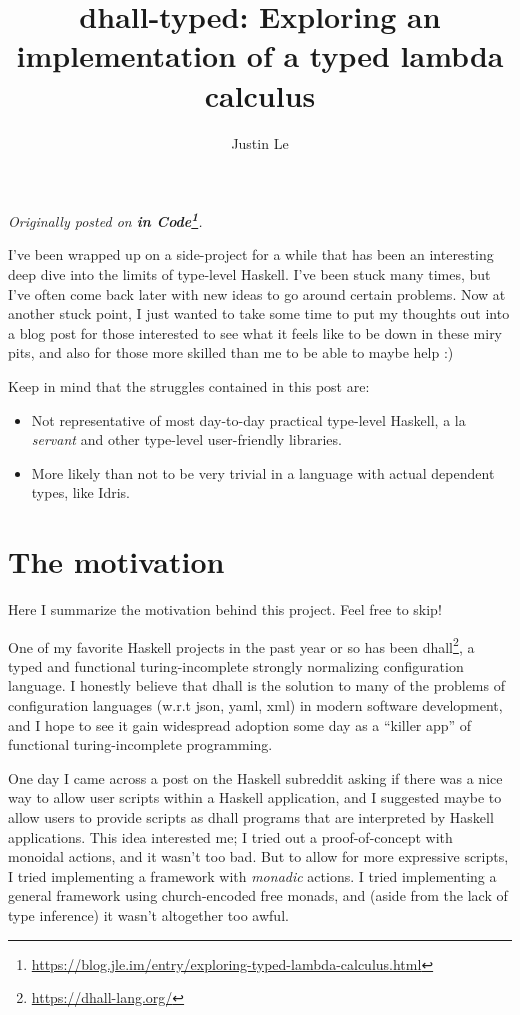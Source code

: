 \documentclass[]{article}
\title{dhall-typed: Exploring an implementation of a typed lambda calculus}
\author{Justin Le}
\renewcommand{\href}[2]{#2\footnote{\url{#1}}}
\begin{document}
\maketitle

\emph{Originally posted on
\textbf{\href{https://blog.jle.im/entry/exploring-typed-lambda-calculus.html}{in
Code}}.}

I've been wrapped up on a side-project for a while that has been an interesting
deep dive into the limits of type-level Haskell. I've been stuck many times, but
I've often come back later with new ideas to go around certain problems. Now at
another stuck point, I just wanted to take some time to put my thoughts out into
a blog post for those interested to see what it feels like to be down in these
miry pits, and also for those more skilled than me to be able to maybe help :)

Keep in mind that the struggles contained in this post are:

\begin{itemize}
\tightlist
\item
  Not representative of most day-to-day practical type-level Haskell, a la
  \emph{servant} and other type-level user-friendly libraries.
\item
  More likely than not to be very trivial in a language with actual dependent
  types, like Idris.
\end{itemize}

\hypertarget{the-motivation}{%
\section{The motivation}\label{the-motivation}}

Here I summarize the motivation behind this project. Feel free to skip!

One of my favorite Haskell projects in the past year or so has been
\href{https://dhall-lang.org/}{dhall}, a typed and functional turing-incomplete
strongly normalizing configuration language. I honestly believe that dhall is
the solution to many of the problems of configuration languages (w.r.t json,
yaml, xml) in modern software development, and I hope to see it gain widespread
adoption some day as a ``killer app'' of functional turing-incomplete
programming.

One day I came across a post on the Haskell subreddit asking if there was a nice
way to allow user scripts within a Haskell application, and I suggested maybe to
allow users to provide scripts as dhall programs that are interpreted by Haskell
applications. This idea interested me; I tried out a proof-of-concept with
monoidal actions, and it wasn't too bad. But to allow for more expressive
scripts, I tried implementing a framework with \emph{monadic} actions. I tried
implementing a general framework using church-encoded free monads, and (aside
from the lack of type inference) it wasn't altogether too awful.
\end{document}
